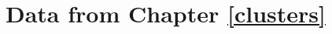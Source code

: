 \documentclass{upenndiss}
\begin{document}
\chapter{Data from Chapter \ref{clusters}}  \label{A}

%



\end{document}
